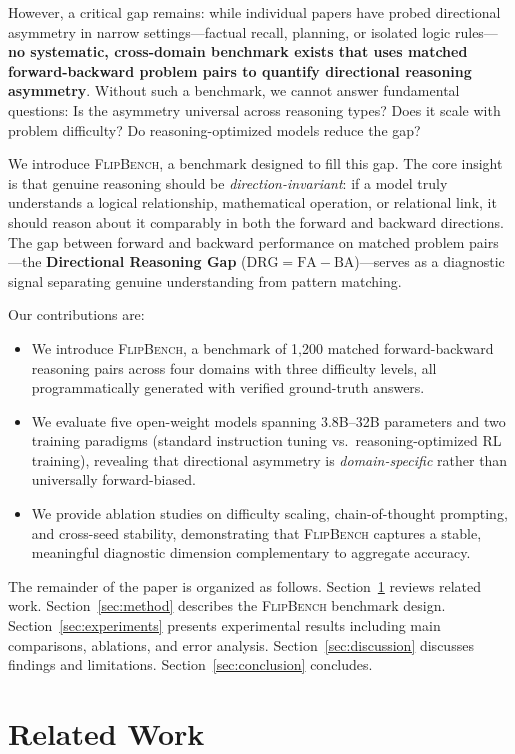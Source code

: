 \documentclass{article}
\newcommand{\drg}{\text{DRG}\xspace}
\newcommand{\fa}{\text{FA}\xspace}
\newcommand{\ba}{\text{BA}\xspace}
\newcommand{\flipbench}{\textsc{FlipBench}\xspace}
\begin{document}
However, a critical gap remains: while individual papers have probed directional asymmetry in narrow settings---factual recall, planning, or isolated logic rules---\textbf{no systematic, cross-domain benchmark exists that uses matched forward-backward problem pairs to quantify directional reasoning asymmetry}. Without such a benchmark, we cannot answer fundamental questions: Is the asymmetry universal across reasoning types? Does it scale with problem difficulty? Do reasoning-optimized models reduce the gap?

We introduce \flipbench, a benchmark designed to fill this gap. The core insight is that genuine reasoning should be \emph{direction-invariant}: if a model truly understands a logical relationship, mathematical operation, or relational link, it should reason about it comparably in both the forward and backward directions. The gap between forward and backward performance on matched problem pairs---the \textbf{Directional Reasoning Gap} ($\drg = \fa - \ba$)---serves as a diagnostic signal separating genuine understanding from pattern matching.

Our contributions are:
\begin{itemize}
    \item We introduce \flipbench, a benchmark of 1,200 matched forward-backward reasoning pairs across four domains with three difficulty levels, all programmatically generated with verified ground-truth answers.
    \item We evaluate five open-weight models spanning 3.8B--32B parameters and two training paradigms (standard instruction tuning vs.\ reasoning-optimized RL training), revealing that directional asymmetry is \emph{domain-specific} rather than universally forward-biased.
    \item We provide ablation studies on difficulty scaling, chain-of-thought prompting, and cross-seed stability, demonstrating that \flipbench captures a stable, meaningful diagnostic dimension complementary to aggregate accuracy.
\end{itemize}

The remainder of the paper is organized as follows. Section~\ref{sec:related} reviews related work. Section~\ref{sec:method} describes the \flipbench benchmark design. Section~\ref{sec:experiments} presents experimental results including main comparisons, ablations, and error analysis. Section~\ref{sec:discussion} discusses findings and limitations. Section~\ref{sec:conclusion} concludes.

\section{Related Work}
\label{sec:related}
\end{document}
